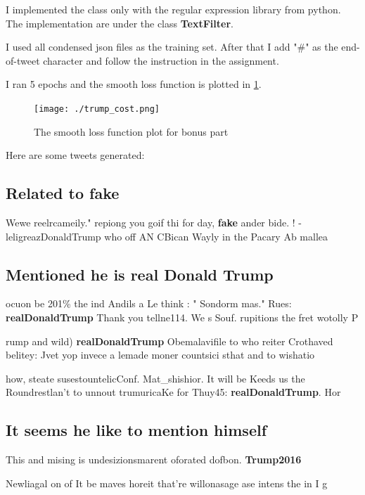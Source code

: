 \documentclass[12pt]{article}
\begin{document}
I implemented the class only with the regular expression library from python.
The implementation are under the class \textbf{TextFilter}.

I used all condensed json files as the training set.
After that I add "\#" as the end-of-tweet character and follow the instruction
in the assignment.

I ran 5 epochs and the smooth loss function is plotted in \cref{plt:trump_smooth_loss}.

\begin{figure}[h]
    \centering
    \texttt{[image: ./trump\_cost.png]}
    \caption{The smooth loss function plot for bonus part}
    \label{plt:trump_smooth_loss}
\end{figure}

Here are some tweets generated:

\subsection*{Related to fake} 

Wewe reelrcameily."
repiong you goif thi for day, \textbf{fake} ander bide.
! - leligreazDonaldTrump who off  AN CBican Wayly in the Pacary Ab mallea

\subsection*{Mentioned he is real Donald Trump }

ocuon be 201\% the ind Andils a Le think
: " Sondorm mas."
Rues: \textbf{realDonaldTrump} Thank you tellne114. We s Souf.
rupitions the fret wotolly P

rump and wild) \textbf{realDonaldTrump} Obemalavifile to who reiter Crothaved belitey: Jvet yop invece a lemade moner countsici sthat and to wishatio


how, steate susestountelicConf. Mat\_shishior. It will be Keeds us the Roundrestlan't to unnout trumuricaKe for Thuy45: \textbf{realDonaldTrump}.
Hor

\subsection*{It seems he like to mention himself}

This and mising is undesizionsmarent oforated dofbon. \textbf{Trump2016}

Newliagal on of It be maves horeit that're willonasage ase intens the in I g
\end{document}
